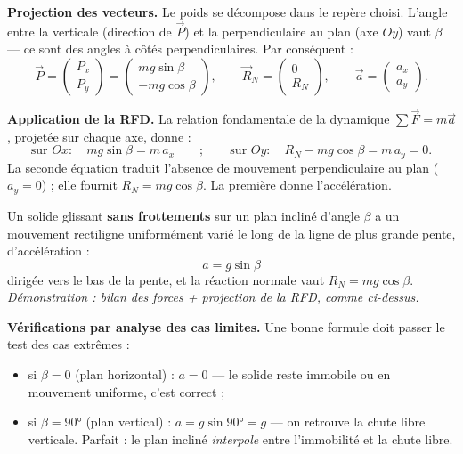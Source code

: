 \documentclass[11pt]{article}
\begin{document}
\textbf{Projection des vecteurs.} Le poids se décompose dans le repère choisi. L'angle entre la verticale (direction de $\vec{P}$) et la perpendiculaire au plan (axe $Oy$) vaut $\beta$ — ce sont des angles à côtés perpendiculaires. Par conséquent :
\[
\vec{P} = \begin{pmatrix} P_x \\ P_y \end{pmatrix} = \begin{pmatrix} mg\sin\beta \\ -mg\cos\beta \end{pmatrix},
\qquad
\vec{R}_N = \begin{pmatrix} 0 \\ R_N \end{pmatrix},
\qquad
\vec{a} = \begin{pmatrix} a_x \\ a_y \end{pmatrix}.
\]

\textbf{Application de la RFD.} La relation fondamentale de la dynamique $\sum \vec{F} = m\vec{a}$, projetée sur chaque axe, donne :
\[
\text{sur } Ox : \quad mg\sin\beta = m\,a_x
\qquad ; \qquad
\text{sur } Oy : \quad R_N - mg\cos\beta = m\,a_y = 0.
\]
La seconde équation traduit l'absence de mouvement perpendiculaire au plan ($a_y = 0$) ; elle fournit $R_N = mg\cos\beta$. La première donne l'accélération.

\begin{propriete}
Un solide glissant \textbf{sans frottements} sur un plan incliné d'angle $\beta$ a un mouvement rectiligne uniformément varié le long de la ligne de plus grande pente, d'accélération :
\[
\boxed{\;a = g\sin\beta\;}
\]
dirigée vers le bas de la pente, et la réaction normale vaut $R_N = mg\cos\beta$. \emph{Démonstration : bilan des forces + projection de la RFD, comme ci-dessus.}
\end{propriete}

\textbf{Vérifications par analyse des cas limites.} Une bonne formule doit passer le test des cas extrêmes :
\begin{itemize}
\item si $\beta = 0$ (plan horizontal) : $a = 0$ — le solide reste immobile ou en mouvement uniforme, c'est correct ;
\item si $\beta = 90°$ (plan vertical) : $a = g\sin 90° = g$ — on retrouve la chute libre verticale. Parfait : le plan incliné \emph{interpole} entre l'immobilité et la chute libre.
\end{itemize}
\end{document}
